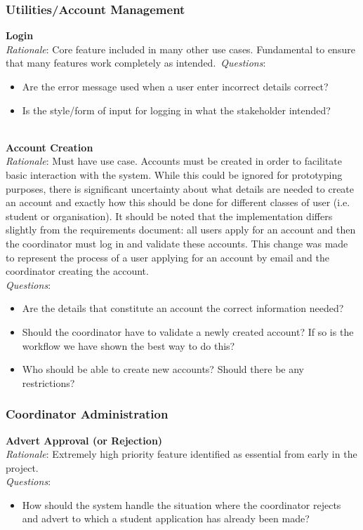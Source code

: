 \documentclass{l3deliverable}
\begin{document}
\subsubsection{Utilities/Account Management}
\textbf{Login}\\
\emph{Rationale}: Core feature included in many other use cases. Fundamental to ensure
that many features work completely as intended.\
\emph{Questions}:
\begin{itemize}
\item{Are the error message used when a user enter incorrect details correct?}
\item{Is the style/form of input for logging in what the stakeholder intended?}
\end{itemize}
\\

\textbf{Account Creation}\\
\emph{Rationale}: Must have use case. Accounts must be created in order to facilitate basic interaction with the system.
While this could be ignored for prototyping purposes, there is significant uncertainty about what details are needed to
create an account and exactly how this should be done for different classes of user (i.e. student or organisation). It should be noted that the implementation differs slightly
from the requirements document: all users apply for an account and then the coordinator must log in and validate these accounts. This change was made to represent the process
of a user applying for an account by email and the coordinator creating the account.\\
\emph{Questions}:
\begin{itemize}
\item{Are the details that constitute an account the correct information needed?}
\item{Should the coordinator have to validate a newly created account? If so is the workflow we have shown the best way to
do this?}
\item{Who should be able to create new accounts? Should there be any restrictions?}
\end{itemize}

\subsubsection{Coordinator Administration}
\textbf{Advert Approval (or Rejection)}\\
\emph{Rationale}: Extremely high priority feature identified as essential from early in the project.\\
\emph{Questions}: 
\begin{itemize}
\item{How should the system handle the situation where the coordinator rejects and advert to which
a student application has already been made?}
\end{itemize}
\\
\end{document}
